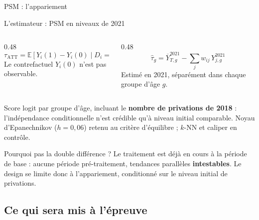\documentclass[10pt,aspectratio=169]{beamer}
\begin{document}
\begin{frame}{PSM : l'appariement}
\end{frame}

\begin{frame}{L'estimateur : PSM en niveaux de 2021}
  \footnotesize
  \centering
  \begin{columns}[T]
    \begin{column}{0.48\linewidth}
      \centering
      \vspace{-0.1cm}
      \begin{equation*}
        \tau_{\text{ATT}} = \mathbb{E}[Y_i(1) - Y_i(0) \mid D_i = 1]
      \end{equation*}
      {\scriptsize Le contrefactuel $Y_i(0)$ n'est pas observable.}
    \end{column}
    \begin{column}{0.48\linewidth}
      \centering
      \vspace{-0.1cm}
      \begin{equation*}
        \hat{\tau}_{g} = \overline{Y}^{2021}_{T,g} -
          \textstyle\sum_j w_{ij}\, Y^{2021}_{j,g}
      \end{equation*}
      {\scriptsize Estimé en 2021, séparément dans chaque groupe d'âge $g$.}
    \end{column}
  \end{columns}

  \smallskip
  {\scriptsize Score logit par groupe d'âge, incluant le \textbf{nombre de
   privations de 2018} : l'indépendance conditionnelle n'est crédible qu'à
   niveau initial comparable. Noyau d'Epanechnikov ($h=0{,}06$) retenu au
   critère d'équilibre ; $k$-NN et caliper en contrôle.}

  \smallskip
  \begin{alertblock}{Pourquoi pas la double différence ?}
    Le traitement est déjà en cours à la période de base : aucune période
    pré-traitement, tendances parallèles \textbf{intestables}. Le design se
    limite donc à l'appariement, conditionné sur le niveau initial de
    privations.
  \end{alertblock}
\end{frame}

\subsection{Ce qui sera mis à l'épreuve}
\end{document}
